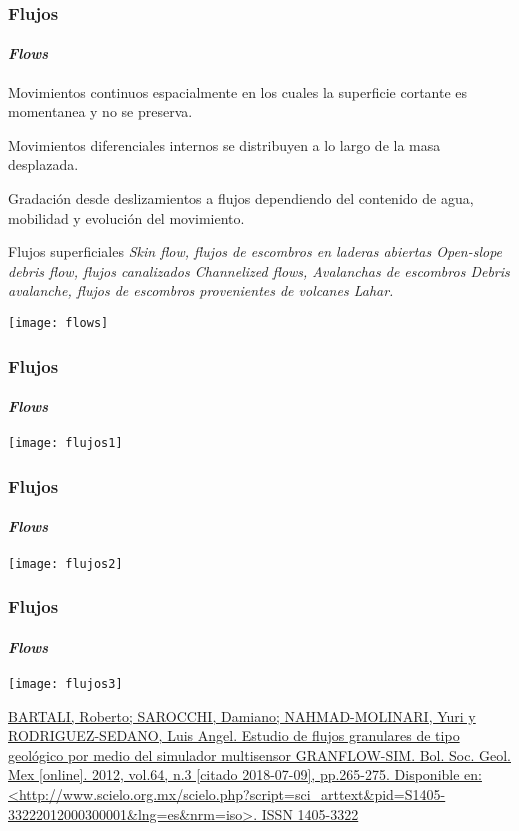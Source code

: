 \documentclass{beamer}
\begin{document}
\begin{frame}
\frametitle{Flujos}
\framesubtitle{\it{Flows}}
\begin{itemize}
\small{
\item Movimientos continuos espacialmente en los cuales la superficie cortante es momentanea y no se preserva.
\item Movimientos diferenciales internos se distribuyen a lo largo de la masa desplazada.
\item Gradación desde deslizamientos a flujos dependiendo del contenido de agua, mobilidad y evolución del movimiento.
\item Flujos superficiales \it{Skin flow}, flujos de escombros en laderas abiertas \it{Open-slope debris flow}, flujos canalizados \it{Channelized flows}, Avalanchas de escombros \it{Debris avalanche}, flujos de escombros provenientes de volcanes \it{Lahar}. 
}
\end{itemize}
\begin{center}
   	\texttt{[image: flows]} 
\end{center}
\end{frame}
\begin{frame}
\frametitle{Flujos}
\framesubtitle{\it{Flows}}
\begin{center}
   	\texttt{[image: flujos1]} 
\end{center}
\end{frame}
\begin{frame}
\frametitle{Flujos}
\framesubtitle{\it{Flows}}
\begin{center}
   	\texttt{[image: flujos2]} 
\end{center}
\end{frame}
\begin{frame}
\frametitle{Flujos}
\framesubtitle{\it{Flows}}
\begin{center}
   	\texttt{[image: flujos3]} 
\end{center}
\tiny{\url{BARTALI, Roberto; SAROCCHI, Damiano; NAHMAD-MOLINARI, Yuri  y  RODRIGUEZ-SEDANO, Luis Angel. Estudio de flujos granulares de tipo geológico por medio del simulador multisensor GRANFLOW-SIM. Bol. Soc. Geol. Mex [online]. 2012, vol.64, n.3 [citado  2018-07-09], pp.265-275. Disponible en: <http://www.scielo.org.mx/scielo.php?script=sci_arttext&pid=S1405-33222012000300001&lng=es&nrm=iso>. ISSN 1405-3322}}
\end{frame}
\end{document}
